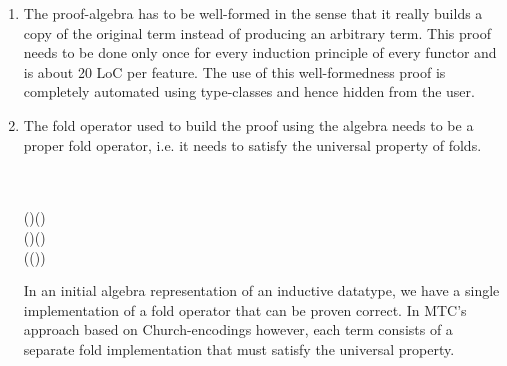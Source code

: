 \begin{enumerate}

\item The proof-algebra has to be well-formed in the sense that it
really builds a copy of the original term instead of producing an
arbitrary term. This proof needs to be done only once for every
induction principle of every functor and is about 20 LoC per
feature. The use of this well-formedness proof is completely automated
using type-classes and hence hidden from the user.

\item The fold operator used to build the proof using the algebra
needs to be a proper fold operator, i.e. it needs to satisfy the
universal property of folds.
\begin{hscode}\SaveRestoreHook
{}%
%
%
%
%
%
%
%
\>[3]{}\mathbin{::}\;\;\to {}\;\to {}\<[E]%
\\
\>[3]{}\;\;\mathrel{=}\;\<[E]%
\\[\blanklineskip]%
\>[3]{}\;\;(\mathbin{::}\mathbin{*}\to \mathbin{*})\;(\mathbin{::}\;){}\<[E]%
\\
\>[3]{}\<[5]%
\>[5]{}\mathrel{=}{}\<[5E]%
\>[8]{}\forall {}\hsforall \;(\mathbin{::}\;\;)\;(\mathbin{::}\;\to {})\<[E]%
\\
\>[8]{}\<[10]%
\>[10]{}(\forall {}\hsforall {}\;(\;)\mathrel{=}\;\;)\to {}\<[E]%
\\
\>[10]{}\<[12]%
\>[12]{}\;\mathrel{=}\;\;\<[E]%
\ColumnHook
\end{hscode}\resethooks
In an initial algebra representation of an inductive datatype, we have
a single implementation of a fold operator that can be proven
correct. In MTC's approach based on Church-encodings however, each
term consists of a separate fold implementation that must satisfy the
universal property.

\end{enumerate}

